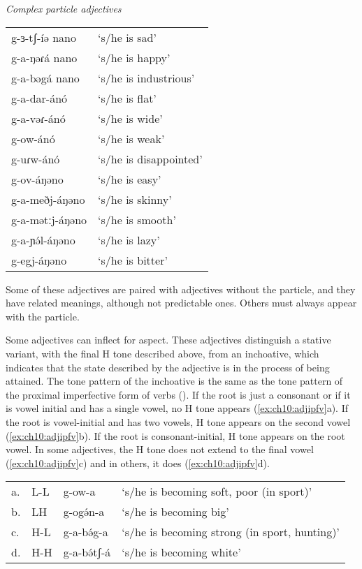 \ea  \textit{Complex particle adjectives} \label{ex:ch10:adjpart}%
\begin{tabular}[t]{ll}
g-ɜ-tʃ-íə nano & ‘s/he  is sad’\\
g-a-ŋəɾá nano & ‘s/he is happy’\\
g-a-bəgá nano & ‘s/he is industrious’\\
g-a-dar-ánó & ‘s/he is flat’\\
g-a-vəɾ-ánó & ‘s/he is wide’\\
g-ow-ánó & ‘s/he is weak’\\
g-uɾw-ánó & ‘s/he is disappointed’\\
g-ov-áŋəno & ‘s/he is easy’\\
g-a-meðj-áŋəno & ‘s/he is skinny’\\
g-a-mətːj-áŋəno & ‘s/he is smooth’\\
g-a-ɲə́l-áŋəno & ‘s/he is lazy’\\
g-egj-áŋəno & ‘s/he is bitter’\\
\end{tabular} \z

Some of these adjectives are paired with adjectives without the particle, and they have related meanings, although not predictable ones. Others must always appear with the particle.%

Some adjectives can inflect for aspect. These adjectives distinguish a stative variant, with the final H tone described above, from an inchoative, which indicates that the state described by the adjective is in the process of being attained. The tone pattern of the inchoative is the same as the tone pattern of the proximal imperfective form of verbs (). If the root is just a consonant or if it is vowel initial and has a single vowel, no H tone appears (\ref{ex:ch10:adjipfv}a). If the root is vowel-initial and has two vowels, H tone appears on the second vowel (\ref{ex:ch10:adjipfv}b). If the root is consonant-initial, H tone appears on the root vowel. In some adjectives, the H tone does not extend to the final vowel (\ref{ex:ch10:adjipfv}c) and in others, it does (\ref{ex:ch10:adjipfv}d).

\ea 
\begin{tabular}[t]{llll}\label{ex:ch10:adjipfv}
a. & L-L & g-ow-a & ‘s/he is becoming soft, poor (in sport)’\\
b. & LH & g-ogə́n-a & ‘s/he is becoming big’	 	\\
c. & H-L & g-a-bə́g-a & ‘s/he is becoming strong (in sport, 
						hunting)’\\
d. & H-H & g-a-bə́tʃ-á & ‘s/he is becoming white’	\\
\end{tabular} 
\z

